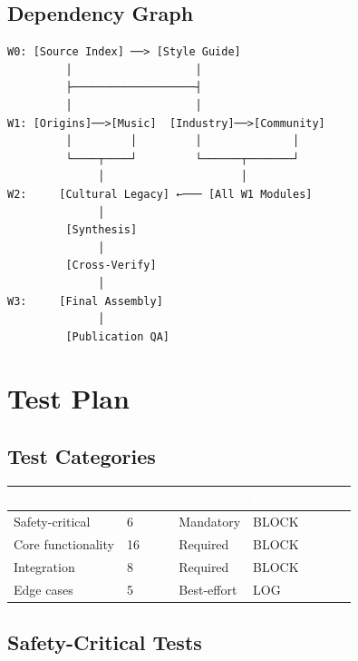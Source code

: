 \documentclass[11pt,letterpaper]{article}
\newcommand{\tableheader}[1]{\textbf{\sffamily\textcolor{white}{#1}}}
\begin{document}
\subsection{Dependency Graph}

\begin{asciibox}
\begin{verbatim}
W0: [Source Index] ──> [Style Guide]
         │                   │
         ├───────────────────┤
         │                   │
W1: [Origins]──>[Music]  [Industry]──>[Community]
         │         │         │              │
         └────┬────┘         └──────┬───────┘
              │                     │
W2:     [Cultural Legacy] ←─── [All W1 Modules]
              │
         [Synthesis]
              │
         [Cross-Verify]
              │
W3:     [Final Assembly]
              │
         [Publication QA]
\end{verbatim}
\end{asciibox}

\section{Test Plan}

\subsection{Test Categories}

\begin{center}
\begin{tabularx}{\textwidth}{L{3cm}C{1.5cm}C{1.5cm}X}
\toprule
{}
\tableheader{Category} & \tableheader{Count} & \tableheader{Priority} & \tableheader{Failure Action} \\
\midrule
Safety-critical & 6 & Mandatory & BLOCK \\
Core functionality & 16 & Required & BLOCK \\
Integration & 8 & Required & BLOCK \\
Edge cases & 5 & Best-effort & LOG \\
\bottomrule
\end{tabularx}
\end{center}

\subsection{Safety-Critical Tests}
\end{document}
